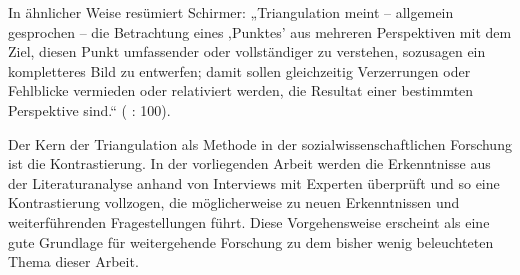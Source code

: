 In ähnlicher Weise resümiert Schirmer: „Triangulation meint – allgemein gesprochen – die Betrachtung eines ‚Punktes’ aus mehreren Perspektiven mit dem Ziel, diesen Punkt umfassender oder vollständiger zu verstehen, sozusagen ein kompletteres Bild zu entwerfen; damit sollen gleichzeitig Verzerrungen oder Fehlblicke vermieden oder relativiert werden, die Resultat einer bestimmten Perspektive sind.“ (\cite{schirmer} : 100). \par
Der Kern der Triangulation als Methode in der sozialwissenschaftlichen Forschung ist die Kontrastierung. In der vorliegenden Arbeit werden die Erkenntnisse aus der Literaturanalyse anhand von Interviews mit Experten überprüft und so eine Kontrastierung vollzogen, die möglicherweise zu neuen Erkenntnissen und weiterführenden Fragestellungen führt. Diese Vorgehensweise erscheint als eine gute Grundlage für weitergehende Forschung zu dem bisher wenig beleuchteten Thema dieser Arbeit.\par

